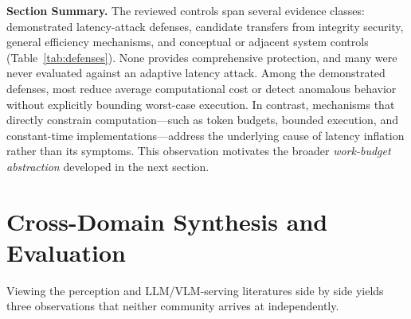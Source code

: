 \documentclass[acmsmall,screen,review,nonacm]{acmart}
\begin{document}

\textbf{Section Summary.} The reviewed controls span several evidence classes: demonstrated latency-attack defenses, candidate transfers from integrity security, general efficiency mechanisms, and conceptual or adjacent system controls (Table~\ref{tab:defenses}). None provides comprehensive protection, and many were never evaluated against an adaptive latency attack. Among the demonstrated defenses, most reduce average computational cost or detect anomalous behavior without explicitly bounding worst-case execution. In contrast, mechanisms that directly constrain computation---such as token budgets, bounded execution, and constant-time implementations---address the underlying cause of latency inflation rather than its symptoms. This observation motivates the broader \textit{work-budget abstraction} developed in the next section.

\section{Cross-Domain Synthesis and Evaluation}
\label{sec:synthesis}

Viewing the perception and LLM/VLM-serving literatures side by side yields three observations that neither community arrives at independently.
\end{document}

